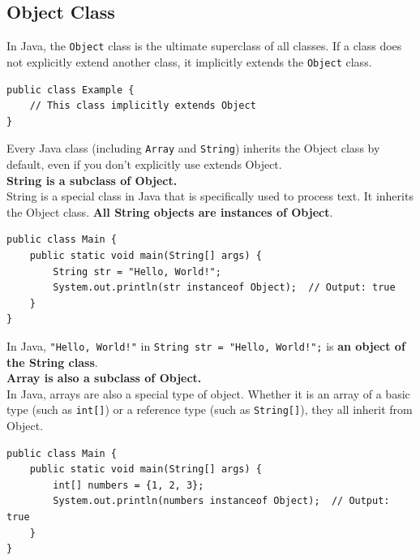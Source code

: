 \documentclass[letterpaper,12pt]{article}
\begin{document}
\subsection{Object Class}
In Java, the \texttt{Object} class is the ultimate superclass of all classes. If a class does not explicitly extend another class, it implicitly extends the \texttt{Object} class.
\begin{verbatim}
public class Example {
    // This class implicitly extends Object
}
\end{verbatim}
Every Java class (including \texttt{Array} and \texttt{String}) inherits the Object class by default, even if you don't explicitly use extends Object.\\
\textbf{String is a subclass of Object.}\\
String is a special class in Java that is specifically used to process text. It inherits the Object class. \textbf{All String objects are instances of Object}.
\begin{verbatim}
public class Main {
    public static void main(String[] args) {
        String str = "Hello, World!";
        System.out.println(str instanceof Object);  // Output: true
    }
}
\end{verbatim}
In Java, \texttt{"Hello, World!"} in \texttt{String str = "Hello, World!";} is \textbf{an object of the String class}.\\
\textbf{Array is also a subclass of Object.}\\
In Java, arrays are also a special type of object. Whether it is an array of a basic type (such as \texttt{int[]}) or a reference type (such as \texttt{String[]}), they all inherit from Object.
\begin{verbatim}
public class Main {
    public static void main(String[] args) {
        int[] numbers = {1, 2, 3};
        System.out.println(numbers instanceof Object);  // Output: true
    }
}
\end{verbatim}
\end{document}
